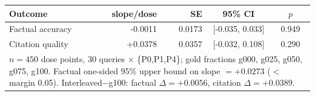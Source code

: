 \begin{tabular}{lrrcc}
\toprule
Outcome & slope/dose & SE & 95\% CI & $p$\\
\midrule
Factual accuracy & -0.0011 & 0.0173 & [-0.035, 0.033] & 0.949 \\
Citation quality & +0.0378 & 0.0357 & [-0.032, 0.108] & 0.290 \\
\midrule
\multicolumn{5}{l}{\footnotesize $n=450$ dose points, 30 queries $\times$ \{P0,P1,P4\}; gold fractions {g000, g025, g050, g075, g100}. Factual one-sided 95\% upper bound on slope $=+0.0273$ ($<$ margin 0.05). Interleaved$-$g100: factual $\Delta=+0.0056$, citation $\Delta=+0.0389$.} \\
\bottomrule
\end{tabular}